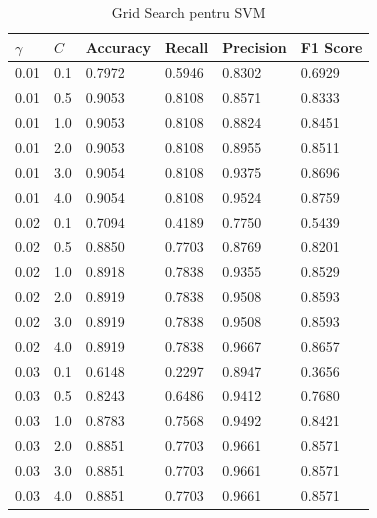 \begin{table}[H]
    \centering
    \begin{tabularx}{\textwidth}{
        |X
        |X
        |X
        |X
        |X
        |X|
    }
    \hline
    $\gamma$ & $C$ & {Accuracy} & {Recall} & {Precision} & {F1 Score} \\
    \hline
    \rowcolor{gray!20} 0.01 & 0.1 & 0.7972 & 0.5946 & 0.8302 & 0.6929 \\
    0.01 & 0.5 & 0.9053 & 0.8108 & 0.8571 & 0.8333 \\
    \rowcolor{gray!20} 0.01 & 1.0 & 0.9053 & 0.8108 & 0.8824 & 0.8451 \\
    0.01 & 2.0 & 0.9053 & 0.8108 & 0.8955 & 0.8511 \\
    \rowcolor{gray!20} 0.01 & 3.0 & 0.9054 & 0.8108 & 0.9375 & 0.8696 \\
    \rowcolor{red!40} 0.01 & 4.0 & 0.9054 & 0.8108 & 0.9524 & 0.8759 \\
    \rowcolor{gray!20} 0.02 & 0.1 & 0.7094 & 0.4189 & 0.7750 & 0.5439 \\
    0.02 & 0.5 & 0.8850 & 0.7703 & 0.8769 & 0.8201 \\
    \rowcolor{gray!20} 0.02 & 1.0 & 0.8918 & 0.7838 & 0.9355 & 0.8529 \\
    0.02 & 2.0 & 0.8919 & 0.7838 & 0.9508 & 0.8593 \\
    \rowcolor{gray!20} 0.02 & 3.0 & 0.8919 & 0.7838 & 0.9508 & 0.8593 \\
    0.02 & 4.0 & 0.8919 & 0.7838 & 0.9667 & 0.8657 \\
    \rowcolor{gray!20} 0.03 & 0.1 & 0.6148 & 0.2297 & 0.8947 & 0.3656 \\
    0.03 & 0.5 & 0.8243 & 0.6486 & 0.9412 & 0.7680 \\
    \rowcolor{gray!20} 0.03 & 1.0 & 0.8783 & 0.7568 & 0.9492 & 0.8421 \\
    0.03 & 2.0 & 0.8851 & 0.7703 & 0.9661 & 0.8571 \\
    \rowcolor{gray!20} 0.03 & 3.0 & 0.8851 & 0.7703 & 0.9661 & 0.8571 \\
    0.03 & 4.0 & 0.8851 & 0.7703 & 0.9661 & 0.8571 \\
    \hline
    \end{tabularx}
    \caption{Grid Search pentru SVM}
\end{table}
  